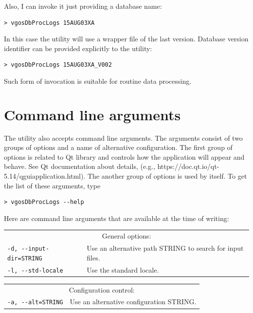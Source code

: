 \documentclass [10pt,letterpaper]{report}
\begin{document}
Also, I can invoke it just providing a database name:
\begin{verbatim}
> vgosDbProcLogs 15AUG03XA
\end{verbatim}
\noindent
In this case the utility will use a wrapper file of the last version. Database
version identifier can be provided explicitly to the utility:
\begin{verbatim}
> vgosDbProcLogs 15AUG03XA_V002
\end{verbatim}
\noindent
Such form of invocation is suitable for routine data processing.


\section{Command line arguments}
\label{sect_command_line_arguments}

The utility also accepts command line arguments. The arguments consist of
two groups of options and a name of alternative configuration. The first
group of options is related to Qt library and controls how the application
will appear and behave. See Qt documentation about details, (e.g.,
https://doc.qt.io/qt-5.14/qguiapplication.html).
The another group of options is used by itself. To get the list
of these arguments, type
\begin{verbatim}
> vgosDbProcLogs --help
\end{verbatim}
\noindent
Here are command line arguments that are available at the time of writing:
\vspace{5mm}

\begin{tabular}{p{\leftSp}p{\riteSp}}
\multicolumn{2}{c}{General options:}\\
{\tt -d, -{}-input-dir=STRING}  & Use an alternative path STRING to search for input files.\\
{\tt -l, -{}-std-locale}        & Use the standard locale.\\
\end{tabular}
\vspace{5mm}

\begin{tabular}{p{\leftSp}p{\riteSp}}
\multicolumn{2}{c}{Configuration control:}\\
{\tt -a, -{}-alt=STRING}        & Use an alternative configuration STRING.\\
\end{tabular}
\vspace{5mm}
\end{document}
